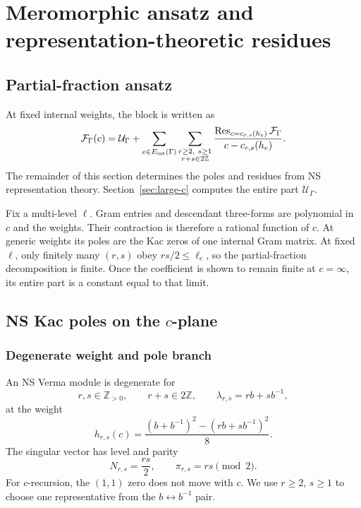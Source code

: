 \documentclass[11pt]{article}
\newcommand{\F}{\mathcal F}
\newcommand{\U}{\mathcal U}
\DeclareMathOperator{\Res}{Res}
\begin{document}
\section{Meromorphic ansatz and representation-theoretic residues}
\label{sec:meromorphic-ansatz}

\subsection{Partial-fraction ansatz}

At fixed internal weights, the block is written as
\begin{equation}
 \F_\Gamma(c)=\U_\Gamma
 +\sum_{e\in E_{\rm int}(\Gamma)}
  \sum_{\substack{r\ge2,\ s\ge1\\r+s\in2\mathbb Z}}
  \frac{\Res_{c=c_{r,s}(h_e)}\F_\Gamma}
       {c-c_{r,s}(h_e)}.
 \label{eq:partial-fraction-ansatz}
\end{equation}
The remainder of this section determines the poles and residues from NS
representation theory.  Section~\ref{sec:large-c} computes the entire part
\(\U_\Gamma\).

Fix a multi-level \(\bm\ell\).  Gram entries and descendant three-forms are
polynomial in \(c\) and the weights.  Their contraction is therefore a
rational function of \(c\).  At generic weights its poles are the Kac zeros
of one internal Gram matrix.  At fixed \(\bm\ell\), only finitely many
\((r,s)\) obey \(rs/2\le\ell_e\), so the partial-fraction decomposition is
finite.  Once the coefficient is shown to remain finite at \(c=\infty\),
its entire part is a constant equal to that limit.

\subsection{\texorpdfstring{NS Kac poles on the \(c\)-plane}
{NS Kac poles on the c-plane}}
\label{sec:kac-poles}

\subsubsection{Degenerate weight and pole branch}

An NS Verma module is degenerate for
\begin{equation}
 r,s\in\mathbb Z_{>0},
 \qquad r+s\in2\mathbb Z,
 \qquad
 \lambda_{r,s}=rb+s b^{-1},
 \label{eq:kac-labels}
\end{equation}
at the weight
\begin{equation}
 h_{r,s}(c)
 =\frac{(b+b^{-1})^2-(rb+s b^{-1})^2}{8}.
 \label{eq:kac-weight}
\end{equation}
The singular vector has level and parity
\begin{equation}
 N_{r,s}=\frac{rs}{2},
 \qquad
 \pi_{r,s}=rs\pmod2.
 \label{eq:null-level-parity}
\end{equation}
For \(c\)-recursion, the \((1,1)\) zero does not move with \(c\).  We use
\(r\ge2\), \(s\ge1\) to choose one representative from the
\(b\leftrightarrow b^{-1}\) pair.
\end{document}
